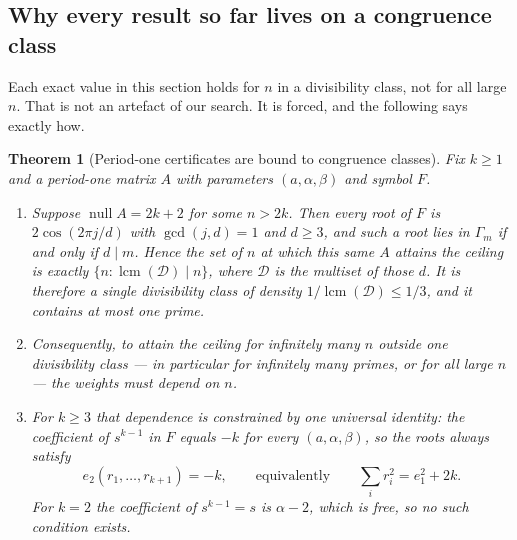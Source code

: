 \documentclass[11pt]{article}
\newtheorem{theorem}{Theorem}
\theoremstyle{definition}
\begin{document}
\subsection*{Why every result so far lives on a congruence class}
Each exact value in this section holds for $n$ in a divisibility class, not for
all large $n$. That is not an artefact of our search. It is forced, and the
following says exactly how.

\begin{theorem}[Period-one certificates are bound to congruence classes]
\label{thm:congbound}
Fix $k\ge1$ and a period-one matrix $A$ with parameters $(a,\alpha,\beta)$ and
symbol $F$.
\begin{enumerate}
\item[(i)] Suppose $\operatorname{null}A=2k+2$ for some $n>2k$. Then every root
of $F$ is $2\cos(2\pi j/d)$ with $\gcd(j,d)=1$ and $d\ge3$, and such a root
lies in $\Gamma_m$ if and only if $d\mid m$. Hence the set of $n$ at which
\emph{this same} $A$ attains the ceiling is exactly
$\{n:\operatorname{lcm}(\mathcal D)\mid n\}$, where $\mathcal D$ is the multiset of those $d$. It
is therefore a single divisibility class of density
$1/\operatorname{lcm}(\mathcal D)\le1/3$, and it contains \emph{at most one prime}.
\item[(ii)] Consequently, to attain the ceiling for infinitely many $n$ outside
one divisibility class --- in particular for infinitely many primes, or for all
large $n$ --- the weights must depend on $n$.
\item[(iii)] For $k\ge3$ that dependence is constrained by one universal
identity: the coefficient of $s^{k-1}$ in $F$ equals $-k$ for \emph{every}
$(a,\alpha,\beta)$, so the roots always satisfy
\[
  e_2(r_1,\dots,r_{k+1})=-k,\qquad\text{equivalently}\qquad
  \sum_i r_i^{2}=e_1^{2}+2k .
\]
For $k=2$ the coefficient of $s^{k-1}=s$ is $\alpha-2$, which is free, so no
such condition exists.
\end{enumerate}
\end{theorem}
\end{document}
